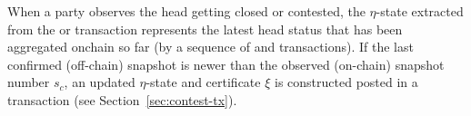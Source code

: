\quad When a party observes
the head getting closed or contested, the $\eta$-state extracted from the
\mtxClose{} or \mtxContest{} transaction represents the latest head status that
has been aggregated onchain so far (by a sequence of \mtxClose{} and
\mtxContest{} transactions). If the last confirmed (off-chain) snapshot is newer
than the observed (on-chain) snapshot number $s_{c}$, an updated $\eta$-state
and certificate $\xi$ is constructed posted in a \mtxContest{} transaction (see
Section~\ref{sec:contest-tx}).



